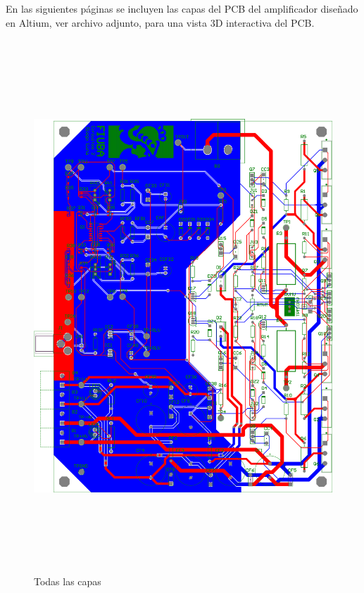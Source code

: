 En las siguientes páginas se incluyen las capas del PCB del amplificador diseñado en Altium, ver archivo adjunto, \textbf{} para una vista 3D interactiva del PCB.

\clearpage

\begin{figure}[H]
    \centering
    \includegraphics[height=200mm, angle=0]{img/PCB/layers/amplifier/all-2D.png}
    \caption{\footnotesize{Todas las capas}}
    \label{fig:pcb_amp_all}
\end{figure}

\clearpage

